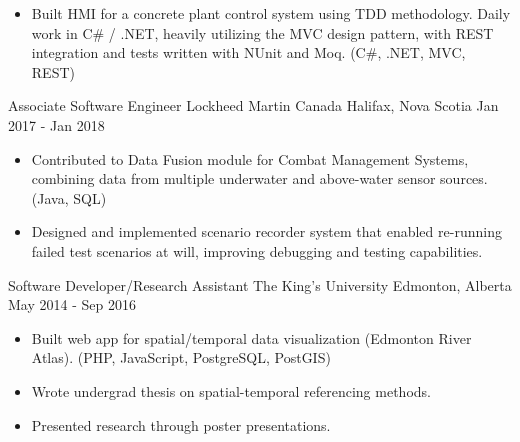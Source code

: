 \begin{cventries}
        {
            \begin{itemize}
                \item Built HMI for a concrete plant control system using TDD methodology. Daily work in C\# / .NET, heavily utilizing the MVC design pattern, with REST integration and tests written with NUnit and Moq. (C\#, .NET, MVC, REST)
            \end{itemize}
        }
    \cventry
        {Associate Software Engineer}
        {Lockheed Martin Canada}
        {Halifax, Nova Scotia}
        {Jan 2017 - Jan 2018}
        {
            \begin{itemize}
                \item Contributed to Data Fusion module for Combat Management Systems, combining data from multiple underwater and above-water sensor sources. (Java, SQL)
                \item Designed and implemented scenario recorder system that enabled re-running failed test scenarios at will, improving debugging and testing capabilities.
            \end{itemize}
        }
    \cventry
        {Software Developer/Research Assistant}
        {The King's University}
        {Edmonton, Alberta}
        {May 2014 - Sep 2016}
        {
            \begin{itemize}
                \item Built web app for spatial/temporal data visualization (Edmonton River Atlas). (PHP, JavaScript, PostgreSQL, PostGIS)
                \item Wrote undergrad thesis on spatial-temporal referencing methods.
                \item Presented research through poster presentations.
            \end{itemize}
        }

\end{cventries}
